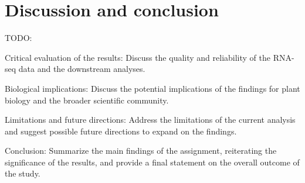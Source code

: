 \section{Discussion and conclusion}

TODO:

Critical evaluation of the results: Discuss the quality and reliability of the RNA-seq data and the downstream analyses.

Biological implications: Discuss the potential implications of the findings for plant biology and the broader scientific community.

Limitations and future directions: Address the limitations of the current analysis and suggest possible future directions to expand on the findings.

Conclusion: Summarize the main findings of the assignment, reiterating the significance of the results, and provide a final statement on the overall outcome of the study.